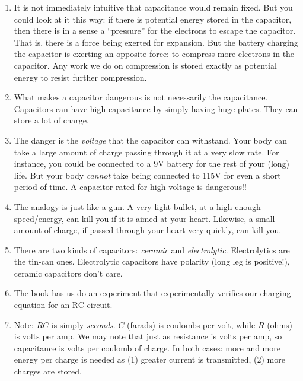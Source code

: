 \documentclass[11pt, oneside]{amsart}
\begin{document}
\begin{enumerate}
  \item It is not immediately intuitive that capacitance would remain
  fixed. But you could look at it this way: if there is potential energy
  stored in the capacitor, then there is in a sense a ``pressure'' for
  the electrons to escape the capacitor. That is, there is a force being
  exerted for expansion. But the battery charging the capacitor is
  exerting an opposite force: to compress more electrons in the
  capacitor. Any work we do on compression is stored exactly as
  potential energy to resist further compression.

  \item What makes a capacitor dangerous is not necessarily the
  capacitance. Capacitors can have high capacitance by simply having
  huge plates. They can store a lot of charge.

  \item The danger is the \emph{voltage} that the capacitor can
  withstand. Your body can take a large amount of charge passing through
  it at a very slow rate. For instance, you could be connected to a 9V
  battery for the rest of your (long) life. But your body \emph{cannot}
  take being connected to 115V for even a short period of time. A
  capacitor rated for high-voltage is dangerous!!

  \item The analogy is just like a gun. A very light bullet, at a high
  enough speed/energy, can kill you if it is aimed at your heart.
  Likewise, a small amount of charge, if passed through your heart very
  quickly, can kill you.

  \item There are two kinds of capacitors: \emph{ceramic} and
  \emph{electrolytic}. Electrolytics are the tin-can ones. Electrolytic
  capacitors have polarity (long leg is positive!), ceramic capacitors
  don't care. 

  \item The book has us do an experiment that experimentally verifies
  our charging equation for an RC circuit.

  \item Note: $RC$ is simply \emph{seconds}. $C$ (farads) is coulombs
  per volt, while $R$ (ohms) is volts per amp. We may note that just as
  resistance is volts per amp, so capacitance is volts per coulomb of
  charge. In both cases: more and more energy per charge is needed as
  (1) greater current is transmitted, (2) more charges are stored.

\end{enumerate}
\end{document}
